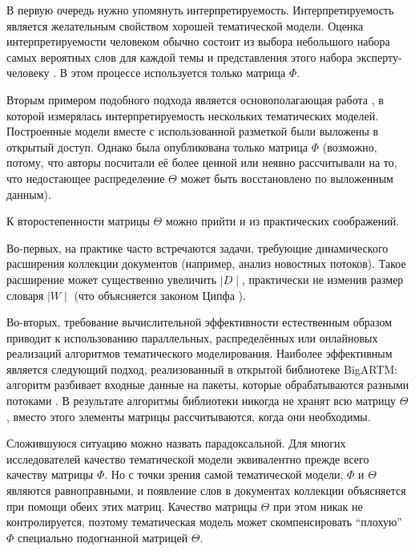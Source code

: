  

В первую очередь нужно упомянуть интерпретируемость. Интерпретируемость является желательным свойством хорошей тематической модели. Оценка интерпретируемости человеком обычно состоит из выбора небольшого набора самых вероятных слов для каждой темы и представления этого набора эксперту-человеку \cite{roder2015exploring}. В этом процессе используется только матрица $\Phi$. 

 

Вторым примером подобного подхода является основополагающая работа \cite{rtl}, в которой измерялась интерпретируемость нескольких тематических моделей. Построенные модели вместе с использованной разметкой были выложены в открытый доступ. Однако была опубликована только матрица $\Phi $ (возможно, потому, что авторы посчитали её более ценной или неявно рассчитывали на то, что недостающее распределение $\Theta$ может быть восстановлено по выложенным данным). 

 

К второстепенности матрицы $\Theta$ можно прийти и из практических соображений. 

 

Во-первых, на практике часто встречаются задачи, требующие динамического расширения коллекции документов (например, анализ новостных потоков). Такое расширение может существенно увеличить $\mid D\mid$, практически не изменив размер словаря $\mid W \mid$ (что объясняется законом Ципфа ). 

 

Во-вторых, требование вычислительной эффективности естественным образом приводит к использованию параллельных, распределённых или онлайновых реализаций алгоритмов тематического моделирования. Наиболее эффективным является следующий подход, реализованный в открытой библиотеке BigARTM: алгоритм разбивает входные данные на пакеты, которые обрабатываются разными потоками \cite{frei2016parallel}. В результате алгоритмы библиотеки никогда не хранят всю матрицу $\Theta$, вместо этого элементы матрицы рассчитываются, когда они необходимы. 

 

Сложившуюся ситуацию можно назвать парадоксальной. Для многих исследователей качество тематической модели эквивалентно прежде всего качеству матрицы $\Phi$. Но с точки зрения самой тематической модели, $\Phi$ и $\Theta$ являются равноправными, и появление слов в документах коллекции объясняется при помощи обеих этих матриц. Качество матрицы $\Theta$ при этом никак не контролируется, поэтому тематическая модель может скомпенсировать ``плохую'' $\Phi$ специально подогнанной матрицей $\Theta$. 

